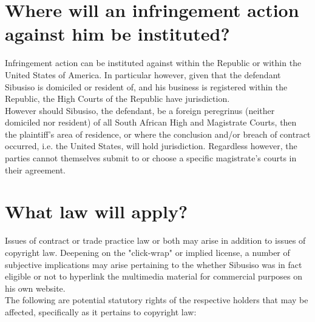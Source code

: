\documentclass[11pt]{article}
\begin{document}
\section{Where will an infringement action against him be instituted?}
\label{sec:org0b5af3c}
Infringement action can be instituted against within the Republic or within the
United States of America. In particular however, given that the defendant
Sibusiso is domiciled or resident of, and his business is registered within the
Republic, the High Courts of the Republic have jurisdiction.\\

However should Sibusiso, the defendant, be a foreign peregrinus (neither
domiciled nor resident) of all South African High and Magistrate Courts, then
the plaintiff's area of residence, or where the conclusion and/or breach of
contract occurred, i.e. the United States, will hold jurisdiction. Regardless
however, the parties cannot themselves submit to or choose a specific
magistrate's courts in their agreement.

\section{What law will apply?}
\label{sec:org0a47a24}
Issues of contract or trade practice law or both may arise in addition to issues
of copyright law. Deepening on the "click-wrap" or implied license, a number of
subjective implications may arise pertaining to the whether Sibusiso was in fact
eligible or not to hyperlink the multimedia material for commercial purposes on
his own website.\\

The following are potential statutory rights of the respective holders that may
be affected, specifically as it pertains to copyright law:
\end{document}
